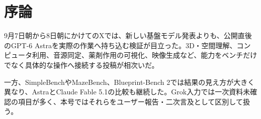 \section{序論}
9月7日朝から8日朝にかけてのXでは、新しい基盤モデル発表よりも、公開直後のGPT-6 Astraを実際の作業へ持ち込む検証が目立った。3D・空間理解、コンピュータ利用、音源同定、薬剤作用の可視化、映像生成など、能力をベンチだけでなく具体的な操作へ接続する投稿が相次いだ。

一方、SimpleBenchやMazeBench、Blueprint-Bench 2では結果の見え方が大きく異なり、AstraとClaude Fable 5.1の比較も継続した。Grok入力では一次資料未確認の項目が多く、本号ではそれらをユーザー報告・二次言及として区別して扱う。
